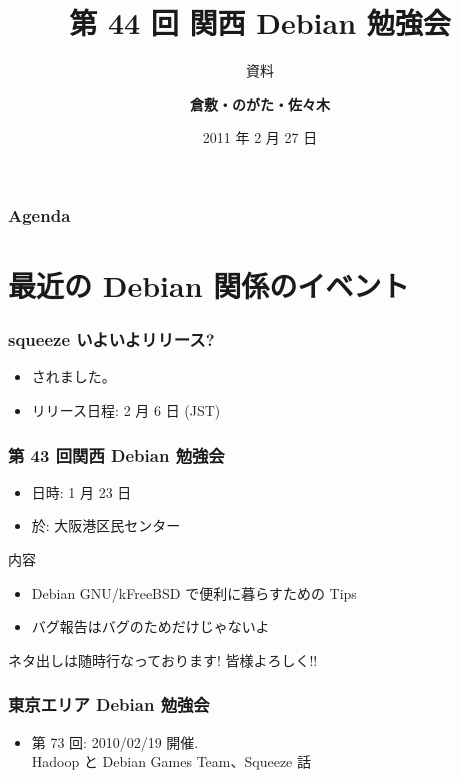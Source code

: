 \documentclass[cjk,dvipdfmx,12pt,%
hyperref={bookmarks=true,bookmarksnumbered=true,bookmarksopen=false,%
colorlinks=false,%
pdftitle={第 44 回 関西 Debian 勉強会},%
pdfauthor={倉敷・のがた・佐々木},%
pdfsubject={資料},%
}]{beamer}
\title{第 44 回 関西 Debian 勉強会}
\subtitle{{\scriptsize 資料}}
\author[佐々木 洋平]{{\large\bf 倉敷・のがた・佐々木}}
\institute[Debian JP]{{\normalsize\tt 関西 Debian 勉強会}}
\date{{\small 2011 年 2 月 27 日}}
\begin{document}
\settitleslide
\begin{frame}
\titlepage
\end{frame}
\setdefaultslide

\begin{frame}[fragile]
\frametitle{Agenda}

\tableofcontents

\end{frame}

\section{最近の Debian 関係のイベント}



\begin{frame}[fragile]
\frametitle{squeeze いよいよリリース?}

\begin{itemize}
\item されました。
\item リリース日程: 2 月 6 日 (JST)
\end{itemize}
\end{frame}

\begin{frame}[fragile]
\frametitle{第 43 回関西 Debian 勉強会}

\begin{itemize}
\item 日時: 1 月 23 日
\item 於: 大阪港区民センター
\end{itemize}

\begin{block}{内容}
  \begin{itemize}
  \item Debian GNU/kFreeBSD で便利に暮らすための Tips
  \item バグ報告はバグのためだけじゃないよ
  \end{itemize}
\end{block}
ネタ出しは随時行なっております! 皆様よろしく!!
\end{frame}

\begin{frame}[fragile]
  \frametitle{東京エリア Debian 勉強会}
  \begin{itemize}
  \item 第 73 回: 2010/02/19 開催. \\ \qquad Hadoop と Debian Games Team、Squeeze 話
  \end{itemize}
\end{frame}
\end{document}
